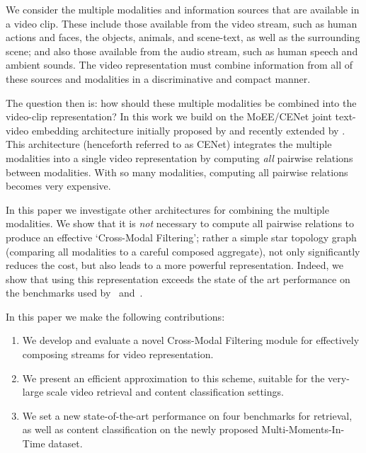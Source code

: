 We consider the multiple modalities and information sources that are
available in a video clip. These include those available from the
video stream, such as human actions and faces, the objects, animals,
and scene-text, as well as the surrounding scene; and also those available
from the audio stream, such as human speech and ambient sounds.
The video representation must combine information from all of these sources and modalities in a discriminative
and compact manner.

The question then is: how should these multiple modalities be combined into the video-clip representation?
In this work we build on the MoEE/CENet joint text-video embedding
architecture initially proposed by \cite{miech2018learning} and
recently extended by \cite{liu2019use}.  This architecture (henceforth
referred to as CENet)  integrates the multiple modalities into a single video representation by computing 
{\em all}  pairwise relations between modalities. With so many modalities, computing all pairwise relations becomes
very expensive.

In this paper we investigate other architectures for combining the multiple modalities. We
 show that it is {\em not} necessary to compute all pairwise
relations to produce an effective `Cross-Modal Filtering'; rather a simple star topology graph (comparing all
modalities to a careful composed aggregate), not only significantly reduces the cost, but also leads to a more powerful representation.
Indeed, we show that using this representation exceeds the state of the art performance on the benchmarks used
by~\cite{miech2018learning} and~\cite{liu2019use}.

In this paper we make the following contributions:
\begin{enumerate}
\item We develop and evaluate a novel Cross-Modal Filtering module for effectively composing streams for video representation.
\item We present an efficient approximation to this scheme, suitable for the very-large scale video retrieval and 
content classification  settings.
\item We set a new state-of-the-art performance on four benchmarks for retrieval, as well as content classification 
on the newly proposed Multi-Moments-In-Time dataset.
\end{enumerate}

